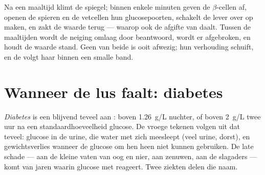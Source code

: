 \begin{example}\label{ex:g12:glucose-and-diabetes:loop}
Na een maaltijd klimt de spiegel; binnen enkele minuten geven de
$\beta$-cellen  af, openen de spieren en de vetcellen hun
glucosepoorten, schakelt de lever over op  maken, en zakt de
waarde terug --- waarop ook de afgifte van  daalt. Tussen de
maaltijden wordt de neiging omlaag door  beantwoord, wordt er
 afgebroken, en houdt de waarde stand. Geen van beide 
is ooit afwezig; hun verhouding schuift, en de  volgt
haar binnen een smalle band.
\end{example}

\section{Wanneer de lus faalt: diabetes}

\begin{definition}[Diabetes]\label{def:g12:glucose-and-diabetes:diabetes}
\emph{Diabetes} is een blijvend teveel aan
: boven \qty{1.26}{g/L} nuchter, of boven \qty{2}{g/L} twee
uur na een standaardhoeveelheid glucose. De vroege tekenen volgen uit dat
teveel: glucose in de urine, die water met zich meesleept (veel urine,
dorst), en gewichtsverlies wanneer  de glucose om hen heen niet
kunnen gebruiken. De late schade --- aan de kleine vaten van oog en nier,
aan zenuwen, aan de slagaders --- komt van jaren waarin glucose met
 reageert. Twee ziekten delen die naam.
\end{definition}

